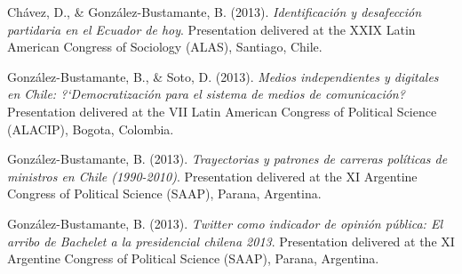 \begin{publications}
\begin{benumerate}{87}
\item{Chávez, D., \& González-Bustamante, B. (2013). {\itshape Identificación y desafección partidaria en el Ecuador de hoy}. Presentation delivered at the XXIX Latin American Congress of Sociology (ALAS), Santiago, Chile.}\vspace{1mm}


\item{González-Bustamante, B., \& Soto, D. (2013). {\itshape Medios independientes y digitales en Chile: ?`Democratización para el sistema de medios de comunicación?} Presentation delivered at the VII Latin American Congress of Political Science (ALACIP), Bogota, Colombia.}\vspace{1mm}


\item{González-Bustamante, B. (2013). {\itshape Trayectorias y patrones de carreras políticas de ministros en Chile (1990-2010)}. Presentation delivered at the XI Argentine Congress of Political Science (SAAP), Parana, Argentina.}\vspace{1mm}


\item{González-Bustamante, B. (2013). {\itshape Twitter como indicador de opinión pública: El arribo de Bachelet a la presidencial chilena 2013}. Presentation delivered at the XI Argentine Congress of Political Science (SAAP), Parana, Argentina.}\vspace{1mm}


\end{benumerate}
\end{publications}
